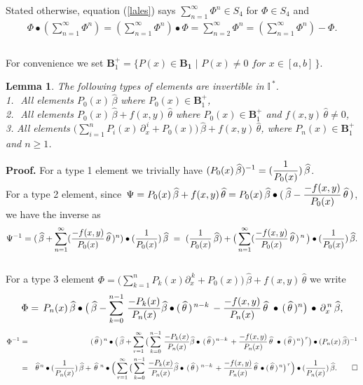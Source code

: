 \documentclass[10pt]{article}
\newcommand{\be}{\begin{equation}}
\newcommand{\ee}{\end{equation}}
\newcommand{\bea}{\begin{eqnarray}}
\newcommand{\eea}{\end{eqnarray}}
\newcommand{\nn}{\nonumber}
\newcommand{\rd}{\partial}
\newcommand{\mIs}{{{\mathbb I}}^{\,*}}
\newcommand{\PP}{\boldsymbol{B}^{+}_1}
\newtheorem{lem}{Lemma}
\begin{document}
{{Stated otherwise, equation (\ref{lales}) says $\sum_{n=1}^{\infty}
\Phi^{n}\in S_4$  for $\Phi\in S_{4}$ and \bea
\Phi\bullet(\sum_{n=1}^{\infty} \Phi^{n})=(\sum_{n=1}^{\infty}
\Phi^{n})\bullet
\Phi=\sum_{n=2}^{\infty}\Phi^{n}=(\sum_{n=1}^{\infty}\Phi^{n})-\Phi.\nn\\\nn\\\nn\eea

For convenience we set $ \PP=\{P(x)\in {\boldsymbol{B_1}}
\,\,|\,\,P(x)\ne 0\,\, for\,\, x\in [a,b]\,\}.$


\begin{lem}\label{hasan}{The following types of elements are invertible in
$\mIs$.\\
1.\,\, All elements $P_{0}(x)\,\widehat{\beta}$ where $P_{0}(x)\in\PP$,\\
2.\,\, All elements $P_{0}(x)\,\widehat{\beta}+f(x,y)\,\widehat{\theta}$ where $P_{0}(x)\in\PP$ and $f(x,y)\,\widehat{\theta}\ne 0$,\\
{3.\,\,All elements $\big(\sum^{n}_{i=1} P_{i}(x)
\,\rd_{x}^{\,i}+P_{0}(x)\big)\,\widehat{\beta}+
 f(x,y)\,\widehat{\theta}$, where  $P_{n}(x)\in\PP$  and $n\ge1$.}
}\end{lem}


{\bf Proof.} For a type 1 element we trivially have
$\displaystyle(P_{0}(x)\,\widehat{\beta})^{-1}=({1\over
P_{0}(x)})\,\widehat{\beta}$.\\
For a type 2 element, since \,$\displaystyle
\Psi=P_{0}(x)\,\widehat{\beta}+f(x,y)\,\widehat{\theta}=P_{0}(x)\,\widehat{\beta}\bullet(\,\widehat\beta-{-f(x,y)\over
P_{0}(x)}\,\widehat{\theta}\,)$, we have the inverse as
\be\Psi^{-1}= (\,\widehat\beta+\sum^{\infty}_{n=1} ({-f(x,y)\over
P_{0}(x)}\,\widehat{\theta}\,)^{n})\bullet({1\over
P_{0}(x)})\,\widehat{\beta}\,\,=\,\,({1\over
P_{0}(x)}\,\widehat{\beta}) +\big(\sum^{\infty}_{n=1} ({-f(x,y)\over
P_{0}(x)}\,\widehat{\theta}\,)^{\, n}\,\big)\bullet({1\over P_{0}(x)})\,\widehat{\beta}.\nn\ee\\
For a type 3 element $\Phi=\big(\sum^{n}_{k=1} P_{k}(x)
\rd_{x}^{\,k}+P_{0}(x)\big)\,\widehat{\beta}+
 f(x,y)\,\widehat{\theta}$  we write
\be \Phi=\, P_{n}(x)\,\widehat{\beta}\bullet\big(\,\widehat\beta
-\sum_{k=0}^{n-1} \,{-P_{k}(x)\over
P_{n}(x)}\widehat{\beta}\bullet(\,\widehat{\theta}\,)^{\,
{n-k}}\,-{-f(x,y)\over
P_{n}(x)}\,\widehat{\theta}\,\,\bullet\,(\,\widehat{\theta}\,)^{n}\big)
\,\bullet \,{\rd^{\,n}_{x}}\,\widehat{\beta},\nn\ee
\bea\Phi^{-1}&=&(\,\widehat{\theta}\,)^{\, n}
 \bullet\big(\,\widehat\beta+ \sum_{r=1}^{\infty}\big(\sum_{k=0}^{n-1} \,{-P_{k}(x)\over
P_{n}(x)}\widehat{\beta}\bullet\,(\,\widehat{\theta}\,)^{\,
{n-k}}\,+{-f(x,y)\over
P_{n}(x)}\,\widehat{\theta}\,\,\bullet\,(\,\widehat{\theta}\,)^{\,
n} \big)^{\,r}\big)\bullet
({P_{n}(x)\,\widehat{\beta}})^{-1}\nn\\&=&\widehat{\theta}^{\,
n}\bullet({1\over
P_{n}(x)})\,\widehat{\beta}+\,\widehat{\theta}\,^{\, n}
\bullet\Big(\sum_{r=1}^{\infty}\big(\sum_{k=0}^{n-1}
\,{-P_{k}(x)\over
P_{n}(x)}\widehat{\beta}\bullet\,(\,\widehat{\theta}\,)^{\,\,
{n-k}}\,+{-f(x,y)\over
P_{n}(x)}\,\widehat{\theta}\,\bullet(\,\widehat{\theta}\,)^{\,n}
\big)^{\,r}\Big)\bullet ({1\over
P_{n}(x)})\,\widehat{\beta}.\nn\qed\eea


}}
\end{document}
